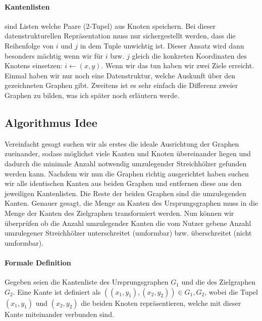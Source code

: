 \documentclass[12pt]{article}
\begin{document}
\paragraph{Kantenlisten} sind Listen welche Paare (2-Tupel) aus Knoten speichern. Bei dieser datenstrukturellen Repräsentation muss nur sichergestellt werden, dass die Reihenfolge von $ i $ und $ j $ in dem Tuple unwichtig ist. Dieser Ansatz wird dann besonders mächtig wenn wir für $ i $ bzw. $ j $ gleich die konkreten Koordinaten des Knotens einsetzen: $ i \leftarrow (x, y) $. Wenn wir das tun haben wir zwei Ziele erreicht. Einmal haben wir nur noch eine Datenstruktur, welche Auskunft über den gezeichneten Graphen gibt. Zweitens ist es sehr einfach die Differenz zweier Graphen zu bilden, was ich später noch erläutern werde.


\subsection*{Algorithmus Idee}

Vereinfacht gesagt suchen wir als erstes die ideale Ausrichtung der Graphen zueinander, sodass möglichst viele Kanten und Knoten übereinander liegen und dadurch die minimale Anzahl notwendig umzulegender Streichhölzer gefunden werden kann. Nachdem wir nun die Graphen richtig ausgerichtet haben suchen wir alle identischen Kanten aus beiden Graphen und entfernen diese aus den jeweiligen Kantenlisten. Die Reste der beiden Graphen sind die umzulegenden Kanten. Genauer gesagt, die Menge an Kanten des Ursprungsgraphen muss in die Menge der Kanten des Zielgraphen transformiert werden. Nun können wir überprüfen ob die Anzahl umzulegender Kanten die vom Nutzer gebene Anzahl umzulegener Streichhölzer unterschreitet (umformbar) bzw. überschreitet (nicht umformbar). 


\paragraph*{Formale Definition}
Gegeben seien die Kantenliste des Ursprungsgraphen $ G_1 $ und die des Zielgraphen $ G_2 $. Eine Kante ist definiert als $ ((x_1, y_1), (x_2, y_2)) \in G_1, G_2 $, wobei die Tupel $ (x_1, y_1) $ und $ (x_2, y_2) $ die beiden Knoten repräsentieren, welche mit dieser Kante miteinander verbunden sind. 
\end{document}
